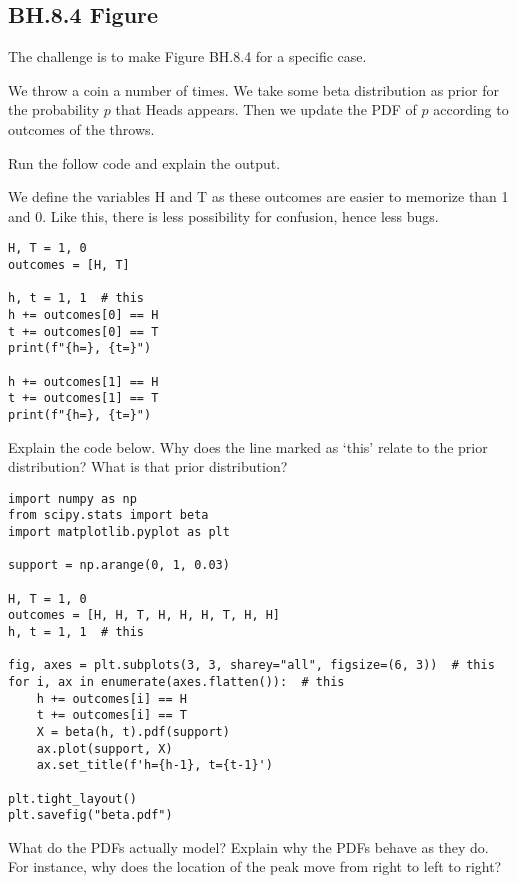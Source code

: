

\subsection{BH.8.4 Figure}
The challenge is to make Figure BH.8.4 for a specific case.

We throw a coin a number of times. We take some beta distribution as prior for the probability $p$ that Heads appears. Then we update the PDF of $p$ according to outcomes of the throws.

\begin{exercise}
Run the follow code and explain the output.

We define the variables H and T as these outcomes are easier to memorize than 1 and 0. Like this, there is less possibility for confusion, hence less bugs.

\begin{verbatim}
H, T = 1, 0
outcomes = [H, T]

h, t = 1, 1  # this
h += outcomes[0] == H
t += outcomes[0] == T
print(f"{h=}, {t=}")

h += outcomes[1] == H
t += outcomes[1] == T
print(f"{h=}, {t=}")
\end{verbatim}
\end{exercise}


\begin{exercise}
Explain the code below. Why does the line marked as `this' relate to the  prior distribution? What is that prior distribution?
\begin{verbatim}
import numpy as np
from scipy.stats import beta
import matplotlib.pyplot as plt

support = np.arange(0, 1, 0.03)

H, T = 1, 0
outcomes = [H, H, T, H, H, H, T, H, H]
h, t = 1, 1  # this

fig, axes = plt.subplots(3, 3, sharey="all", figsize=(6, 3))  # this
for i, ax in enumerate(axes.flatten()):  # this
    h += outcomes[i] == H
    t += outcomes[i] == T
    X = beta(h, t).pdf(support)
    ax.plot(support, X)
    ax.set_title(f'h={h-1}, t={t-1}')

plt.tight_layout()
plt.savefig("beta.pdf")
\end{verbatim}
\end{exercise}

\begin{exercise}
What do the PDFs actually model? Explain why the PDFs behave as they do. For instance, why does the location of the peak move from right to left to right?
\end{exercise}

